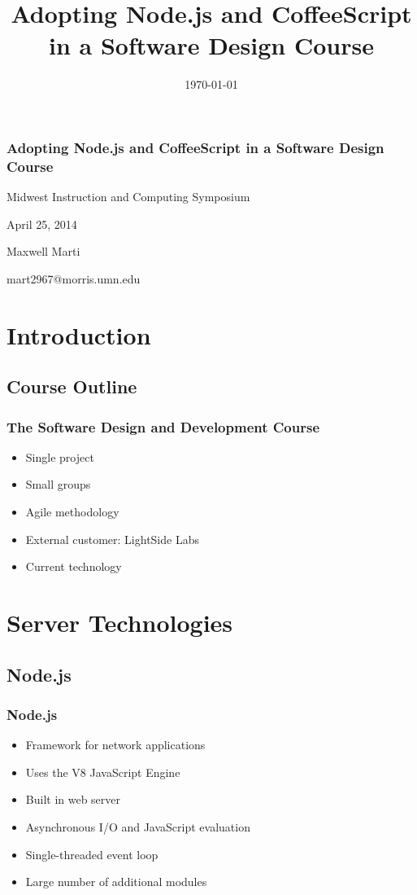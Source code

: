 \documentclass{beamer}
\begin{document}
\title{Adopting Node.js and CoffeeScript in a Software Design Course}
\date{\today}

\begin{frame}
\frametitle{Adopting Node.js and CoffeeScript in a Software Design Course}
{\centering
Midwest Instruction and Computing Symposium\par
April 25, 2014\par
Maxwell Marti\par
mart2967@morris.umn.edu\par
}
\end{frame}



\section{Introduction}
\subsection{Course Outline}
\begin{frame}[fragile]
\frametitle{The Software Design and Development Course}
	\begin{itemize}
  	 \item Single project
  	 \item Small groups
  	 \item Agile methodology
	 \item External customer: LightSide Labs
	 \item Current technology
	\end{itemize}
\end{frame}



\section{Server Technologies}
\subsection{Node.js}
\begin{frame}[fragile]
\frametitle{Node.js}
	\begin{itemize}
  	 \item Framework for network applications
  	 \item Uses the V8 JavaScript Engine
  	 \item Built in web server
	 \item Asynchronous I/O and JavaScript evaluation
	 \item Single-threaded event loop
	 \item Large number of additional modules
	\end{itemize}
\end{frame}
\end{document}
